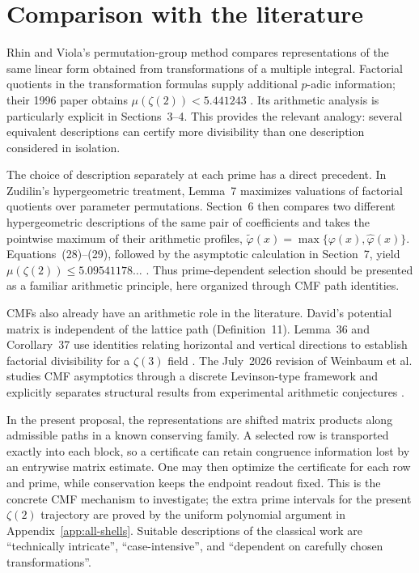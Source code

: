 \documentclass[11pt]{article}
\begin{document}
\section{Comparison with the literature}


Rhin and Viola's permutation-group method compares representations of the
same linear form obtained from transformations of a multiple integral.
Factorial quotients in the transformation formulas supply additional
$p$-adic information; their 1996 paper obtains
$\mu(\zeta(2))<5.441243$ \cite{RhinViola1996}.  Its arithmetic analysis is
particularly explicit in Sections~3--4.  This provides the relevant analogy:
several equivalent descriptions can certify more divisibility than one
description considered in isolation.

The choice of description separately at each prime has a direct precedent.
In Zudilin's hypergeometric treatment, Lemma~7 maximizes valuations of
factorial quotients over parameter permutations.  Section~6 then compares
two different hypergeometric descriptions of the same pair of coefficients
and takes the pointwise maximum of their arithmetic profiles,
$\widetilde\varphi(x)=\max\{\varphi(x),\widehat\varphi(x)\}$.
Equations~(28)--(29), followed by the asymptotic calculation in Section~7,
yield $\mu(\zeta(2))\leq5.09541178\ldots$ \cite{Zudilin2014}.
Thus prime-dependent selection should be presented as a familiar arithmetic
principle, here organized through CMF path identities.

CMFs also already have an arithmetic role in the literature.
David's potential matrix is independent of the lattice path
(Definition~11).  Lemma~36 and Corollary~37 use identities relating
horizontal and vertical directions to establish factorial divisibility
for a $\zeta(3)$ field \cite{David2023}.  The July~2026 revision of
Weinbaum et al. studies CMF asymptotics through a discrete
Levinson-type framework and explicitly separates structural results from
experimental arithmetic conjectures \cite{Weinbaum2026}.

In the present proposal, the representations are shifted matrix products
along admissible paths in a known conserving family.  A selected row is
transported exactly into each block, so a certificate can retain congruence
information lost by an entrywise matrix estimate.  One may then optimize the
certificate for each row and prime, while conservation keeps the endpoint
readout fixed.  This is the concrete CMF mechanism to investigate; the extra prime intervals for the present $\zeta(2)$ trajectory are proved by the uniform polynomial argument in Appendix~\ref{app:all-shells}.  Suitable descriptions of the classical work are
``technically intricate'', ``case-intensive'', and
``dependent on carefully chosen transformations''.
\end{document}
